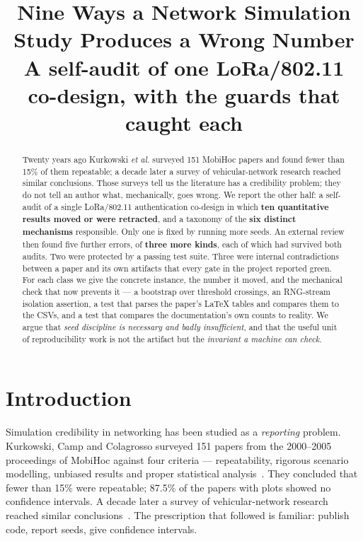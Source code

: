 \documentclass[conference]{IEEEtran}
\begin{document}

\title{Nine Ways a Network Simulation Study Produces a Wrong Number \\
\large A self-audit of one LoRa/802.11 co-design, with the guards that caught each}

\author{
}

\maketitle

\begin{abstract}
Twenty years ago Kurkowski \emph{et al.} surveyed 151 MobiHoc papers and found fewer than 15\% of
them repeatable; a decade later a survey of vehicular-network research reached similar conclusions.
Those surveys tell us the literature has a credibility problem; they do not tell an
author what, mechanically, goes wrong. We report the other half: a self-audit of a single
LoRa/802.11 authentication co-design in which \textbf{ten quantitative results moved or were
retracted}, and a taxonomy of the \textbf{six distinct mechanisms} responsible. Only one is fixed
by running more seeds. An external review then found five further errors, of \textbf{three
more kinds}, each of which had survived both audits. Two were protected by a passing test suite. Three were internal
contradictions between a paper and its own artifacts that every gate in the project reported green.
For each class we give the concrete instance, the number it moved, and the mechanical check that now
prevents it --- a bootstrap over threshold crossings, an RNG-stream isolation assertion, a test that
parses the paper's \LaTeX{} tables and compares them to the CSVs, and a test that compares the
documentation's own counts to reality. We argue that \emph{seed discipline is necessary and badly
insufficient}, and that the useful unit of reproducibility work is not the artifact but the
\emph{invariant a machine can check}.
\end{abstract}

\section{Introduction}
Simulation credibility in networking has been studied as a \emph{reporting} problem. Kurkowski,
Camp and Colagrosso surveyed 151 papers from the 2000--2005 proceedings of MobiHoc against four
criteria --- repeatability, rigorous scenario modelling, unbiased results and proper statistical
analysis~\cite{kurkowski2005incredibles}. They concluded that fewer than 15\% were repeatable;
87.5\% of the papers with plots showed no confidence intervals. A decade later a survey of
vehicular-network research reached similar conclusions~\cite{cavalcanti2018vanet}. The prescription that followed
is familiar: publish code, report seeds, give confidence intervals.
\end{document}
